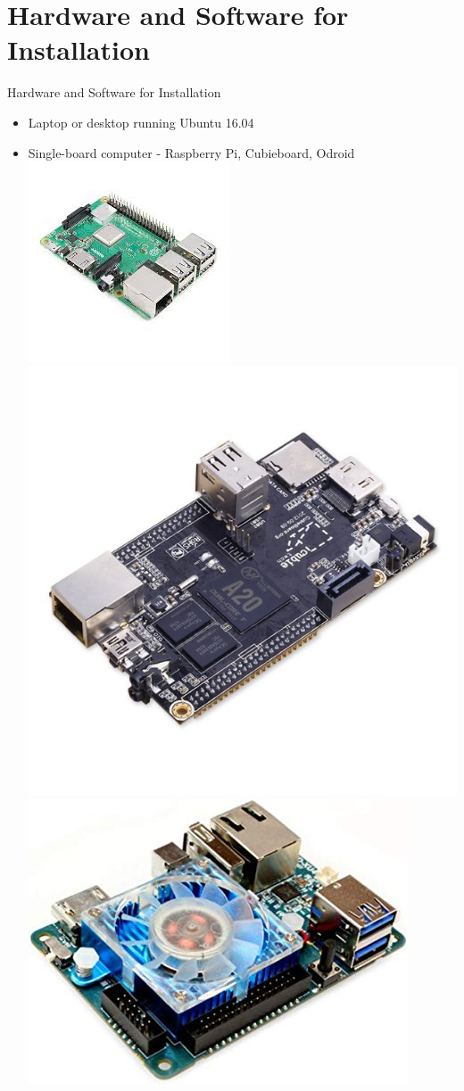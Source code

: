 \documentclass{beamer}
\begin{document}
\section{Hardware and Software for Installation}
\begin{frame}{Hardware and Software for Installation}{}
	\begin{itemize}
		\item Laptop or desktop running Ubuntu 16.04
		\item Single-board computer - Raspberry Pi, Cubieboard, Odroid
		\includegraphics[scale=0.5]{../figs/rpi.jpg}
		\includegraphics[scale=0.15]{../figs/cubieboard.jpg}
		\includegraphics[scale=0.2]{../figs/odroid.jpg}

\end{itemize}
\end{frame}
\end{document}
